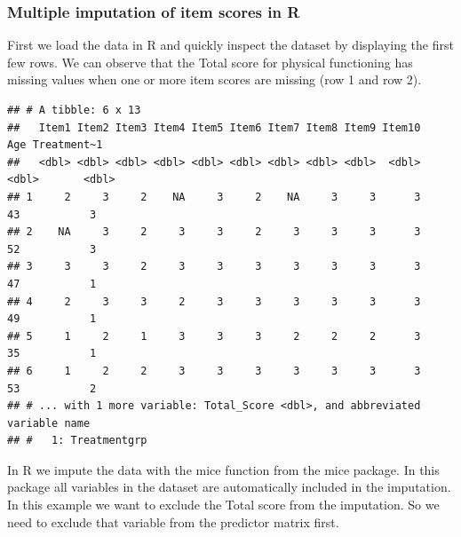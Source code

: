 \documentclass[
]{book}
\newenvironment{Shaded}{\begin{snugshade}}{\end{snugshade}}
\newcommand{\ConstantTok}[1]{\textcolor[rgb]{0.00,0.00,0.00}{#1}}
\newcommand{\DecValTok}[1]{\textcolor[rgb]{0.00,0.00,0.81}{#1}}
\newcommand{\FunctionTok}[1]{\textcolor[rgb]{0.00,0.00,0.00}{#1}}
\newcommand{\NormalTok}[1]{#1}
\newcommand{\OtherTok}[1]{\textcolor[rgb]{0.56,0.35,0.01}{#1}}
\newcommand{\SpecialCharTok}[1]{\textcolor[rgb]{0.00,0.00,0.00}{#1}}
\newcommand{\StringTok}[1]{\textcolor[rgb]{0.31,0.60,0.02}{#1}}
\begin{document}
\hypertarget{multiple-imputation-of-item-scores-in-r}{%
\subsubsection{Multiple imputation of item scores in R}\label{multiple-imputation-of-item-scores-in-r}}

First we load the data in R and quickly inspect the dataset by displaying the first few rows. We can observe that the Total score for physical functioning has missing values when one or more item scores are missing (row 1 and row 2).

\begin{Shaded}
\end{Shaded}

\begin{verbatim}
## # A tibble: 6 x 13
##   Item1 Item2 Item3 Item4 Item5 Item6 Item7 Item8 Item9 Item10   Age Treatment~1
##   <dbl> <dbl> <dbl> <dbl> <dbl> <dbl> <dbl> <dbl> <dbl>  <dbl> <dbl>       <dbl>
## 1     2     3     2    NA     3     2    NA     3     3      3    43           3
## 2    NA     3     2     3     3     2     3     3     3      3    52           3
## 3     3     3     2     3     3     3     3     3     3      3    47           1
## 4     2     3     3     2     3     3     3     3     3      3    49           1
## 5     1     2     1     3     3     3     2     2     2      3    35           1
## 6     1     2     2     3     3     3     3     3     3      3    53           2
## # ... with 1 more variable: Total_Score <dbl>, and abbreviated variable name
## #   1: Treatmentgrp
\end{verbatim}

In R we impute the data with the mice function from the mice package. In this package all variables in the dataset are automatically included in the imputation. In this example we want to exclude the Total score from the imputation. So we need to exclude that variable from the predictor matrix first.
\end{document}
